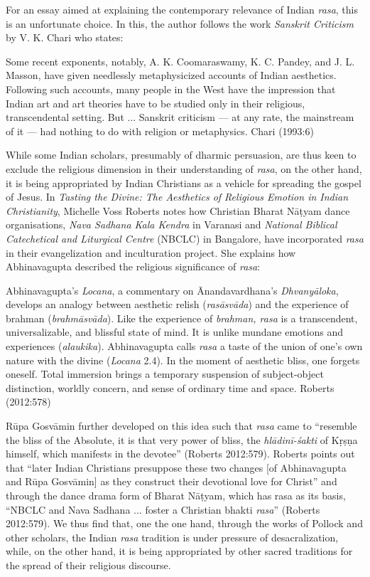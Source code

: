 For an essay aimed at explaining the contemporary relevance of Indian {\sl rasa}, this is an unfortunate choice. In this, the author follows the work {\sl Sanskrit Criticism} by V. K. Chari who states:

\begin{myquote}
Some recent exponents, notably, A. K. Coomaraswamy, K. C. Pandey, and J. L. Masson, have given needlessly metaphysicized accounts of Indian aesthetics. Following such accounts, many people in the West have the impression that Indian art and art theories have to be studied only in their religious, transcendental setting. But ... Sanskrit criticism --- at any rate, the mainstream of it --- had nothing to do with religion or metaphysics. 
\hfill Chari (1993:6)
\end{myquote}

While some Indian scholars, presumably of dharmic persuasion, are thus keen to exclude the religious dimension in their understanding of {\sl rasa}, on the other hand, it is being appropriated by Indian Christians as a vehicle for spreading the gospel of Jesus. In {\sl Tasting the Divine: The Aesthetics of Religious Emotion in Indian Christianity}, Michelle Voss Roberts notes how Christian Bharat Nāṭyam dance organisations, {\sl Nava Sadhana Kala Kendra} in Varanasi and {\sl National Biblical Catechetical and Liturgical Centre} (NBCLC) in Bangalore, have incorporated {\sl rasa} in their evangelization and inculturation project. She explains how Abhinavagupta described the religious significance of {\sl rasa}:

\begin{myquote}
Abhinavagupta's {\sl Locana}, a commentary on Ānandavardhana's {\sl Dhvanyāloka}, develops an analogy between aesthetic relish ({\sl rasāsvāda}) and the experience of brahman ({\sl brahmāsvāda}). Like the experience of {\sl brahman, rasa} is a transcendent, universalizable, and blissful state of mind. It is unlike mundane emotions and experiences ({\sl alaukika}). Abhinavagupta calls {\sl rasa} a taste of the union of one's own nature with the divine ({\sl Locana} 2.4). In the moment of aesthetic bliss, one forgets oneself. Total immersion brings a temporary suspension of subject-object distinction, worldly concern, and sense of ordinary time and space. 
\hfill Roberts (2012:578)
\end{myquote}

Rūpa Gosvāmin further developed on this idea such that {\sl rasa} came to ``resemble the bliss of the Absolute, it is that very power of bliss, the {\sl hlādinī-śakti} of Kṛṣṇa himself, which manifests in the devotee'' (Roberts 2012:579). Roberts points out that ``later Indian Christians presuppose these two changes [of Abhinavagupta and Rūpa Gosvāmin] as they construct their devotional love for Christ'' and through the dance drama form of Bharat Nāṭyam, which has rasa as its basis, ``NBCLC and Nava Sadhana ... foster a Christian bhakti {\sl rasa}'' (Roberts 2012:579). We thus find that, one the one hand, through the works of Pollock and other scholars, the Indian {\sl rasa} tradition is under pressure of desacralization, while, on the other hand, it is being appropriated by other sacred traditions for the spread of their religious discourse.

